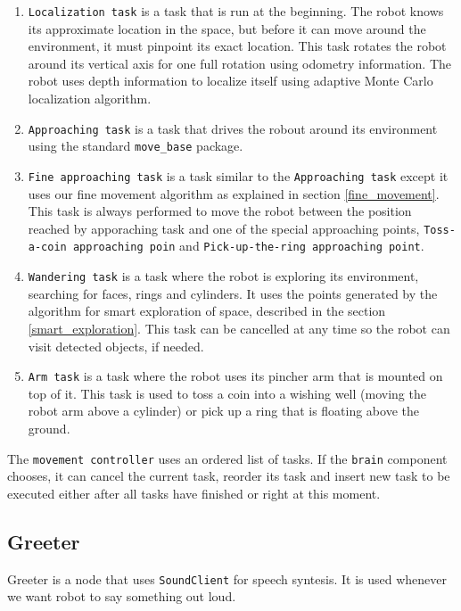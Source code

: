 \documentclass[12pt,a4paper]{article}
\begin{document}
	\begin{enumerate}
		\item \texttt{Localization task} is a task that is run at the beginning. The robot knows its approximate location in the space, but before it can move around the environment, it must pinpoint its exact location. This task rotates the robot around its vertical axis for one full rotation using odometry information. The robot uses depth information to localize itself using adaptive Monte Carlo localization algorithm.
		\item \texttt{Approaching task} is a task that drives the robout around its environment using the standard \texttt{move\_base} package.
		\item \texttt{Fine approaching task} is a task similar to the \texttt{Approaching task} except it uses our fine movement algorithm as explained in section \ref{fine_movement}. This task is always performed to move the robot between the position reached by apporaching task and one of the special approaching points, \texttt{Toss-a-coin approaching poin} and \texttt{Pick-up-the-ring approaching point}.
		\item \texttt{Wandering task} is a task where the robot is exploring its environment, searching for faces, rings and cylinders. It uses the points generated by the algorithm for smart exploration of space, described in the section \ref{smart_exploration}. This task can be cancelled at any time so the robot can visit detected objects, if needed.
		\item \texttt{Arm task} is a task where the robot uses its pincher arm that is mounted on top of it. This task is used to toss a coin into a wishing well (moving the robot arm above a cylinder) or pick up a ring that is floating above the ground.
	\end{enumerate}

	The \texttt{movement controller} uses an ordered list of tasks. If the \texttt{brain} component chooses, it can cancel the current task, reorder its task and insert new task to be executed either after all tasks have finished or right at this moment. \\ 
	
	\subsection{Greeter}
	Greeter is a node that uses \texttt{SoundClient} for speech syntesis. It is used whenever we want robot to say something out loud. \\
	
\end{document}
